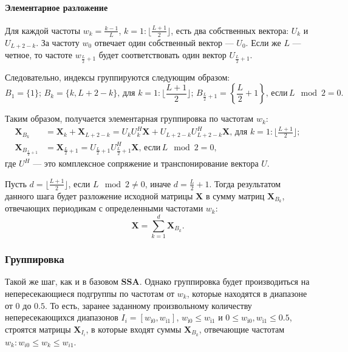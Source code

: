 \documentclass[a4paper, 11pt]{article}
\newcommand{\SSA}{\textbf{SSA}}
\begin{document}
\paragraph{Элементарное разложение \newline}

Для каждой частоты $w_k = \frac{k-1}{L}$, $k = 1:\lfloor \frac{L+1}{2} \rfloor$, есть два собственных вектора: $U_k$ и $U_{L+2-k}$. За частоту $w_0$ отвечает один собственный вектор --- $U_0$. Если же $L$ --- четное, то частоте $w_{\frac{L}{2} + 1}$ будет соответствовать один вектор $U_{\frac{L}{2}+1}$.

Следовательно, индексы группируются следующим образом:
\begin{equation*}
	B_1 = \{1\}; \, B_k = \{k, L+2-k\}, \,  \text{для } k = 1:\lfloor \frac{L+1}{2}\rfloor; \, 
	B_{\frac{L}{2} + 1} = \left\{ \frac{L}{2} + 1 \right\}, \, \text{если} \, L\mod 2 = 0.
\end{equation*}

Таким образом, получается элементарная группировка по частотам $w_k$: 
\begin{align*}
	\mathbf X_{B_k} &= \mathbf X_k + \mathbf X_{L+2-k} = U_k U_k^H \mathbf X + U_{L+2-k} U_{L+2-k}^H \mathbf X, \,  \text{для } k = 1:\lfloor \frac{L+1}{2}\rfloor;\\
	\mathbf X_{B_{\frac{L}{2} + 1}} &= \mathbf X_{{\frac{L}{2} + 1}} = 
	U_{\frac{L}{2} + 1} U_{\frac{L}{2} + 1}^H \mathbf X, \, \text{если} \, L \mod 2 = 0,
\end{align*}
 где $U^H$ --- это комплексное сопряжение и транспонирование вектора $U$.
 
 Пусть $d = \lfloor \frac{L+1}{2} \rfloor$, если $L \mod 2 \not = 0$, иначе $d = \frac{L}{2} + 1$. Тогда результатом данного шага будет разложение исходной матрицы $\mathbf X$ в сумму матриц $\mathbf{X}_{B_k}$, отвечающих периодикам с определенными частотами $w_k$: 
 \begin{equation*}
 	\mathbf X = \sum\limits_{k=1}^d \mathbf{X}_{B_k} .
 \end{equation*}
 
 
\subsubsection{Группировка} 
Такой же шаг, как и в базовом $\SSA$. Однако группировка будет производиться на непересекающиеся подгруппы по частотам от $w_k$, которые находятся в диапазоне от $0$ до $0.5$. То есть, заранее заданному произвольному количеству непересекающихся диапазонов $I_i = \left[w_{\mathrm{i0}}, w_{\mathrm{i1}}\right]$, $w_{\mathrm{i0}} \leq w_{\mathrm{i1}}$ и $0 \leq w_{\mathrm{i0}}, w_{\mathrm{i1}} \leq 0.5$, строятся матрицы $\mathbf X_{I_i}$, в которые входят суммы $\mathbf X_{B_k}$, отвечающие частотам $w_k: w_{i0} \leq w_k \leq w_{i1}$.
\end{document}
